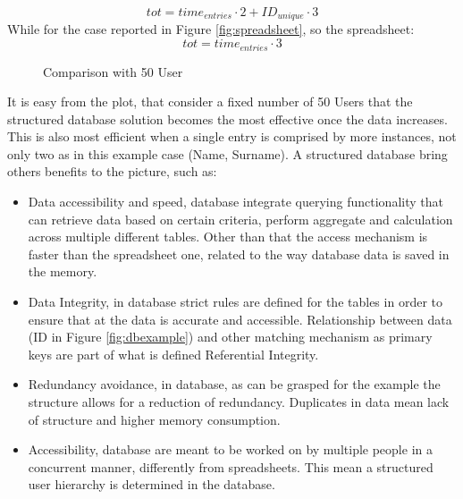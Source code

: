 \documentclass[../main.tex]{subfiles}
\begin{document}
\begin{equation}
    tot = time_{entries} \cdot 2 + ID_{unique} \cdot 3
\end{equation}
While for the case reported in Figure \ref{fig:spreadsheet}, so the spreadsheet:
\begin{equation}
    tot = time_{entries} \cdot 3
\end{equation}
\begin{figure}[H]
    \centering
{}
    \caption{Comparison with 50 User}
    \label{fig:my_label}
\end{figure}
It is easy from the plot, that consider a fixed number of 50 Users that the structured database solution becomes the most effective once the data increases. This is also most efficient when a single entry is comprised by more instances, not only two as in this example case (Name, Surname). A structured database bring others benefits to the picture, such as:
\begin{itemize}
    \item Data accessibility and speed, database integrate querying functionality that can retrieve data based on certain criteria, perform aggregate and calculation across multiple different tables. Other than that the access mechanism is faster than the spreadsheet one, related to the way database data is saved in the memory. 
    \item Data Integrity, in database strict rules are defined for the tables in order to ensure that at the data is accurate and accessible. Relationship between data (ID in Figure \ref{fig:dbexample}) and other matching mechanism as primary keys are part of what is defined Referential Integrity.
    \item Redundancy avoidance, in database, as can be grasped for the example the structure allows for a reduction of redundancy. Duplicates in data mean lack of structure and higher memory consumption. 
    \item Accessibility, database are meant to be worked on by multiple people in a concurrent manner, differently from spreadsheets. This mean a structured user hierarchy is determined in the database. 
\end{itemize}
\end{document}
